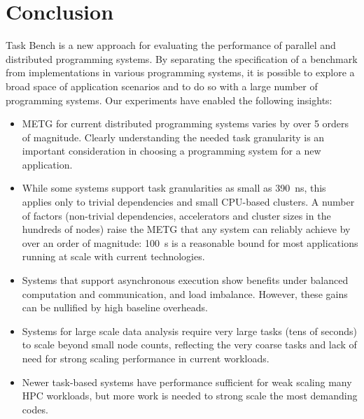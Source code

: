 \section{Conclusion}
\label{sec:conclusion}

Task Bench is a new approach for evaluating the performance of
parallel and distributed programming systems. By separating the
specification of a benchmark from implementations in various
programming systems, it is possible to explore a broad space of
application scenarios and to do so with a large number of programming
systems. Our experiments have enabled the following
insights:

\begin{itemize}

\item METG for current distributed programming systems varies by over
  5 orders of magnitude.  Clearly understanding the needed task
  granularity is an important consideration in choosing a programming
  system for a new application.

\item While some systems support task granularities as small as 390~ns, this applies only to trivial dependencies and small CPU-based clusters. A number of factors (non-trivial dependencies, accelerators and cluster sizes in the hundreds of nodes) raise the
  METG that any system can reliably achieve by over an order of magnitude: 100~\textmu{}s is a reasonable bound for most applications running at scale with current technologies.

\item Systems that support asynchronous execution show benefits under
  balanced computation
  and communication, and load imbalance. However, these gains can be nullified by
  high baseline overheads.

\item Systems for large scale data analysis require very large tasks
  (tens of seconds) to scale beyond small node counts,
  reflecting the very coarse tasks and lack of need for strong scaling
  performance in current workloads.

\item Newer task-based systems have performance sufficient for
  weak scaling many HPC workloads, but more work is needed to strong
  scale the most demanding codes.

\end{itemize}


